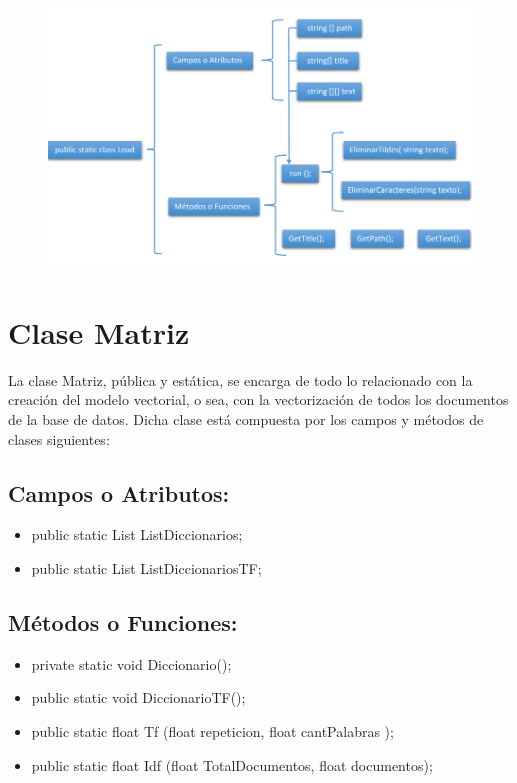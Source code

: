 \documentclass[a4paper,12pt]{article}
\begin{document}
\begin{figure}[h]
\includegraphics[width=17cm]{Grafico 2.png}
\end{figure}
\section*{Clase Matriz}
La clase Matriz, pública y estática, se encarga de todo lo relacionado con la creación del 
modelo vectorial, o sea, con la vectorización de todos los documentos de la base de datos. 
Dicha clase está compuesta por los campos y métodos de clases siguientes:
\subsection*{Campos o Atributos:}
\begin{itemize}
    \item  public static List ListDiccionarios;
    \item public static List ListDiccionariosTF;  
     \end{itemize}
     \subsection*{Métodos o Funciones:}
     \begin{itemize}
         \item private static void Diccionario();
         \item public static void DiccionarioTF();
         \item public static float Tf (float repeticion, float cantPalabras );
         \item public static float Idf (float TotalDocumentos, float documentos);
        \end{itemize}
\end{document}

